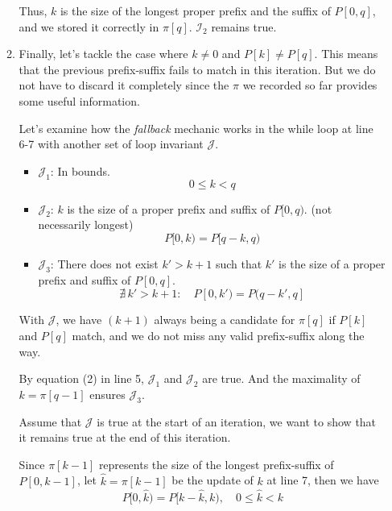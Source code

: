 \documentclass[12pt]{article}
\begin{document}
\begin{enumerate}
\begin{enumerate}
        Thus, \(k\) is the size of the longest proper prefix and the suffix of \(P[0, q]\), and we stored it correctly in \(\pi[q]\). \(\mathcal{I}_2\) remains true.

        \item Finally, let's tackle the case where \(k \neq 0\) and \(P[k] \neq P[q]\). This means that the previous prefix-suffix fails to match in this iteration. But we do not have to discard it completely since the \(\pi\) we recorded so far provides some useful information.

        Let's examine how the \textit{fallback} mechanic works in the while loop at line 6-7 with another set of loop invariant \(\mathcal{J}\).
        \begin{itemize}
            \item \(\mathcal{J}_1\): In bounds.
            \[
                0 \leq k < q
            \]
            \item \(\mathcal{J}_2\): \(k\) is the size of a proper prefix and suffix of \(P[0, q)\). (not necessarily longest)
            \[
                P[0, k) = P[q-k, q)
            \]
            \item \(\mathcal{J}_3\): There does not exist \(k' > k+1\) such that \(k'\) is the size of a proper prefix and suffix of \(P[0, q]\).
            \[
                \nexists \, k' > k+1 : \quad P[0, k') = P(q-k', q]
            \]
        \end{itemize}

        With \(\mathcal{J}\), we have \((k+1)\) always being a candidate for \(\pi[q]\) if \(P[k]\) and \(P[q]\) match, and we do not miss any valid prefix-suffix along the way.

        By equation (2) in line 5, \(\mathcal{J}_1\) and \(\mathcal{J}_2\) are true. And the maximality of \(k = \pi[q-1]\) ensures \(\mathcal{J}_3\).
        
        Assume that \(\mathcal{J}\) is true at the start of an iteration, we want to show that it remains true at the end of this iteration.

        Since \(\pi[k-1]\) represents the size of the longest prefix-suffix of \(P[0, k-1]\), let \(\hat{k} = \pi[k-1]\) be the update of \(k\) at line 7, then we have
        \begin{equation} %
            P[0, \hat{k}) = P[k - \hat{k}, k), \quad 0 \leq \hat{k} < k
        \end{equation}


\end{enumerate}
\end{enumerate}
\end{document}
